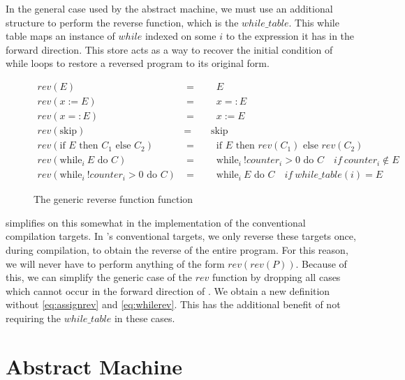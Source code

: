 In the general case used by the abstract machine, we must use an additional structure to perform the reverse function, which is the $while\_table$. This while table maps an instance of $while$ indexed on some $i$ to the expression it has in the forward direction. This store acts as a way to recover the initial condition of while loops to restore a reversed program to its original form.

\begin{figure}[hbt!]
    \centering
    \small
    \begin{align}
        rev(E) &=\quad\quad E \tag{expression} \\
        rev(x := E) &=\quad\quad x =: E \tag{assignment} \\
        rev(x =: E) &=\quad\quad x := E \tag{reverse assignment}\label{eq:assignrev} \\
        rev(\text{skip}) &=\quad\quad \text{skip} \tag{skip} \\
        rev(\text{if } E \text{ then } C_1 \text{ else } C_2) &=\quad\quad \text{if } E \text{ then } rev(C_1) \text{ else } rev(C_2) \tag{if} \\
        rev(\text{while}_i\ E \text{ do } C) &=\quad\quad \text{while}_i\ !counter_i > 0 \text{ do } C \quad if\ counter_i \not\in E \tag{while forward} \\
        rev(\text{while}_i\ !counter_i > 0 \text{ do } C) &=\quad\quad \text{while}_i\ E \text{ do } C \quad if\ while\_table(i) = E \tag{while backward}\label{eq:whilerev}
    \end{align}
    \caption{The generic reverse function function}
    \label{fig:revfunc}
\end{figure}

\rimp simplifies on this somewhat in the implementation of the conventional compilation targets. In \rimp's conventional targets, we only reverse these targets once, during compilation, to obtain the reverse of the entire program. For this reason, we will never have to perform anything of the form $rev(rev(P))$. Because of this, we can simplify the generic case of the $rev$ function by dropping all cases which cannot occur in the forward direction of \rimplang. We obtain a new definition without \ref{eq:assignrev} and \ref{eq:whilerev}. This has the additional benefit of not requiring the $while\_table$ in these cases.

\section{Abstract Machine}\label{AbstractMachine}

